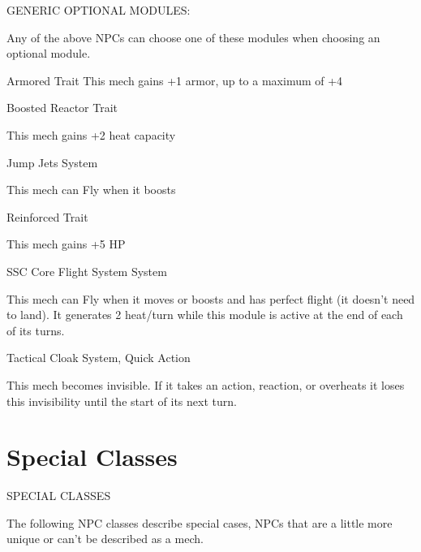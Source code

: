 






















   

                                     GENERIC OPTIONAL MODULES:  

Any of the above NPCs can choose one of these modules when choosing an optional module.
 

Armored  
Trait  
This mech gains +1 armor, up to a maximum of +4
 

Boosted Reactor  
Trait
 
This mech gains +2 heat capacity
 

Jump Jets  
System
 
This mech can Fly when it boosts
 

Reinforced  
Trait
 
This mech gains +5 HP
 

SSC Core Flight System  
System
 
This mech can Fly when it moves or boosts and has perfect flight (it doesn’t need to land). It  
generates 2 heat/turn while this module is active at the end of each of its turns.
 

Tactical Cloak  
System, Quick Action
 
This mech becomes invisible. If it takes an action, reaction, or overheats it loses this invisibility  
until the start of its next turn.
 
\chapter{Special Classes}
      SPECIAL CLASSES  

The following NPC classes describe special cases, NPCs that are a little more unique or can’t be  
described as a mech.

